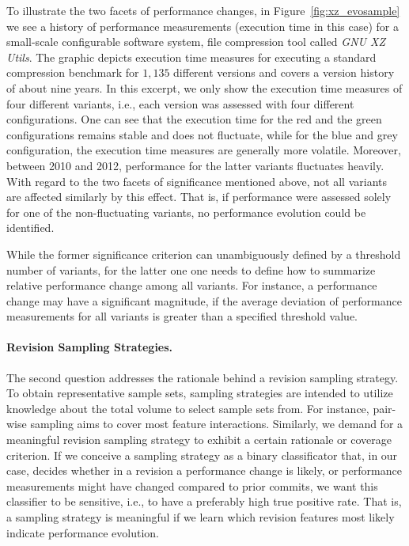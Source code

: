 To illustrate the two facets of performance changes, in
Figure~\ref{fig:xz_evosample} we see a history of performance measurements (execution time in this case) for a
small-scale configurable software system, file compression tool called \emph{GNU
XZ Utils}. The graphic depicts execution time measures for executing a standard
compression benchmark for $1,135$ different versions and covers a version
history of about nine years. In this excerpt, we only show the execution time measures
of four different variants, i.e., each version was assessed with four different
configurations. One can see that the execution time for the red and the green
configurations remains stable and does not fluctuate, while for the blue and
grey configuration, the execution time measures are generally more volatile.
Moreover, between 2010 and 2012, performance for the latter variants fluctuates
heavily. With regard to the two facets of significance mentioned above, not all
variants are affected similarly by this effect. That is, if performance were
assessed solely for one of the non-fluctuating variants, no performance
evolution could be identified.

While the former significance criterion can unambiguously defined by a threshold
number of variants, for the latter one one needs to define how to summarize
relative performance change among all variants. For instance, a performance
change may have a significant magnitude, if the average deviation of
performance measurements for all variants is greater than a specified threshold
value.

\paragraph{Revision Sampling Strategies.} The second question addresses the
rationale behind a revision sampling strategy. To obtain representative sample sets, sampling
strategies are intended to utilize knowledge about the total volume to select
sample sets from. For instance, pair-wise sampling aims to cover most feature
interactions. Similarly, we demand for a meaningful revision sampling strategy
to exhibit a certain rationale or coverage criterion. If we conceive a sampling
strategy as a binary classificator that, in our case, decides whether in a
revision a performance change is likely, or performance measurements might have
changed compared to prior commits, we want  this classifier to be sensitive,
i.e., to have a preferably high true positive rate. That is, a sampling
strategy is meaningful if we learn which revision features most likely indicate
performance evolution.
 

